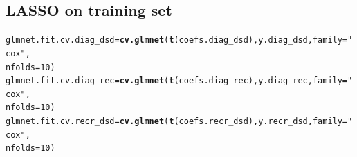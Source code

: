 \documentclass{article}\usepackage[]{graphicx}\usepackage[]{color}
\makeatletter
\newcommand{\hlnum}[1]{\textcolor[rgb]{0.686,0.059,0.569}{#1}}%
\newcommand{\hlstr}[1]{\textcolor[rgb]{0.192,0.494,0.8}{#1}}%
\newcommand{\hlstd}[1]{\textcolor[rgb]{0.345,0.345,0.345}{#1}}%
\newcommand{\hlkwb}[1]{\textcolor[rgb]{0.69,0.353,0.396}{#1}}%
\newcommand{\hlkwc}[1]{\textcolor[rgb]{0.333,0.667,0.333}{#1}}%
\newcommand{\hlkwd}[1]{\textcolor[rgb]{0.737,0.353,0.396}{\textbf{#1}}}%
\newenvironment{kframe}{%
 \def\at@end@of@kframe{}%
 \ifinner\ifhmode%
  \def\at@end@of@kframe{\end{minipage}}%
  \begin{minipage}{\columnwidth}%
 \fi\fi%
 \def\FrameCommand##1{\hskip\@totalleftmargin \hskip-\fboxsep
 \colorbox{shadecolor}{##1}\hskip-\fboxsep
     \hskip-\linewidth \hskip-\@totalleftmargin \hskip\columnwidth}%
 \MakeFramed {\advance\hsize-\width
   \@totalleftmargin\z@ \linewidth\hsize
   \@setminipage}}%
 {\par\unskip\endMakeFramed%
 \at@end@of@kframe}
\newenvironment{knitrout}{}{} %
\makeatother
\begin{document}
\subsection{LASSO on training set}
\begin{knitrout}
\color{fgcolor}\begin{kframe}
\begin{alltt}
\hlstd{glmnet.fit.cv.diag_dsd} \hlkwb{=} \hlkwd{cv.glmnet}\hlstd{(}\hlkwd{t}\hlstd{(coefs.diag_dsd), y.diag_dsd,} \hlkwc{family} \hlstd{=} \hlstr{"cox"}\hlstd{,}
    \hlkwc{nfolds} \hlstd{=} \hlnum{10}\hlstd{)}
\hlstd{glmnet.fit.cv.diag_rec} \hlkwb{=} \hlkwd{cv.glmnet}\hlstd{(}\hlkwd{t}\hlstd{(coefs.diag_rec), y.diag_rec,} \hlkwc{family} \hlstd{=} \hlstr{"cox"}\hlstd{,}
    \hlkwc{nfolds} \hlstd{=} \hlnum{10}\hlstd{)}
\hlstd{glmnet.fit.cv.recr_dsd} \hlkwb{=} \hlkwd{cv.glmnet}\hlstd{(}\hlkwd{t}\hlstd{(coefs.recr_dsd), y.recr_dsd,} \hlkwc{family} \hlstd{=} \hlstr{"cox"}\hlstd{,}
    \hlkwc{nfolds} \hlstd{=} \hlnum{10}\hlstd{)}
\end{alltt}
\end{kframe}
\end{knitrout}
\end{document}
